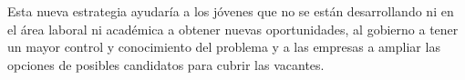 
Esta nueva estrategia ayudaría a los jóvenes que no se están desarrollando ni en el área laboral ni académica a obtener nuevas oportunidades, al gobierno a tener un mayor control y conocimiento del problema y a las empresas a ampliar las opciones de posibles candidatos para cubrir las vacantes.
\\

 




\bigskip
